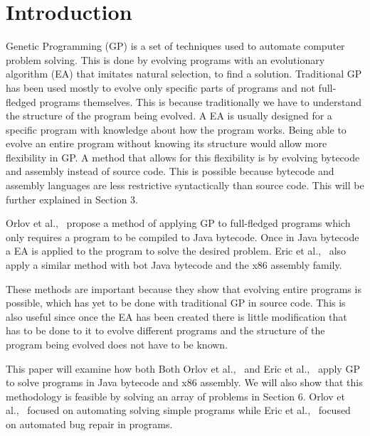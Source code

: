 \documentclass{sig-alternate}
\begin{document}

\section{Introduction}
Genetic Programming (GP) is a set of techniques used to automate computer problem solving. This is done by evolving programs with an evolutionary algorithm (EA) that imitates natural selection, to find a solution. Traditional GP has been used mostly to evolve only specific parts of programs and not full-fledged programs themselves. This is because traditionally we have to understand the structure of the program being evolved. A EA is usually designed for a specific program with knowledge about how the program works. Being able to evolve an entire program without knowing its structure would allow more flexibility in GP. A method that allows for this flexibility is by evolving bytecode and assembly instead of source code. This is possible because bytecode and assembly languages are less restrictive syntactically than source code. This will be further explained in Section 3.\par 

Orlov et al.,~\cite{FINCH2:2009} propose a method of applying GP to full-fledged programs which only requires a program to be compiled to Java bytecode. Once in Java bytecode a EA is applied to the program to solve the desired problem. Eric et al.,~\cite{Assembly:2010} also apply a similar method with bot Java bytecode and the x86 assembly family. 

These methods are important because they show that evolving entire programs is possible, which has yet to be done with traditional GP in source code. This is also useful since once the EA has been created there is little modification that has to be done to it to evolve different programs and the structure of the program being evolved does not have to be known.\par

	This paper will examine how both Both Orlov et al.,~\cite{FINCH:2011} and Eric et al.,~\cite{Assembly:2010} apply GP to solve programs in Java bytecode and x86 assembly. We will also show that this methodology is feasible by solving an array of problems in Section 6. Orlov et al.,~\cite{FINCH:2011} focused on automating solving simple programs while Eric et al.,~\cite{Assembly:2010} focused on automated bug repair in programs.\par 
	
\end{document}
